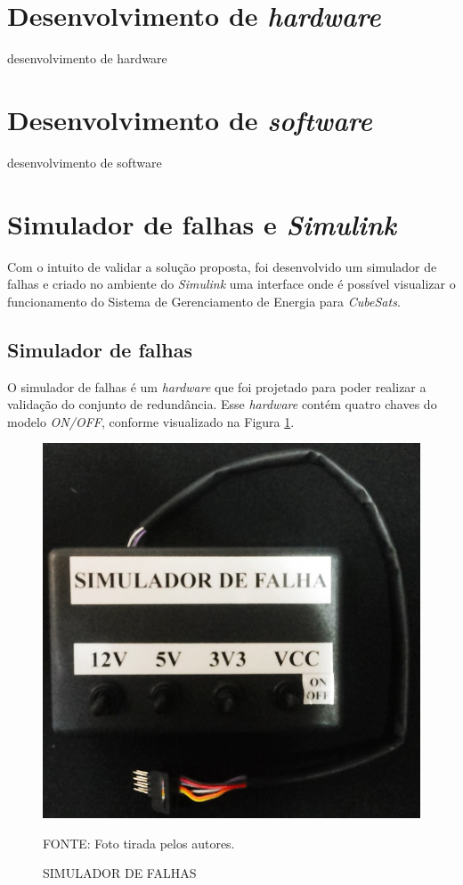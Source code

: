 \documentclass[
	12pt,				%
	openright,			%
	oneside,			%
	a4paper,			%
	english,			%
	french,				%
	spanish,			%
	brazil,				%
	oldfontcommands
	]{abntex2}
\begin{document}
\section[Desenvolvimento de hardware]{Desenvolvimento de \textit{hardware}}

desenvolvimento de hardware

\section[Desenvolvimento de software]{Desenvolvimento de \textit{software}}

desenvolvimento de software

\section[Simulador de falhas e Simulink]{Simulador de falhas e \textit{Simulink}}

	Com o intuito de validar a solução proposta, foi desenvolvido um simulador de falhas e criado no ambiente do \textit{Simulink} uma interface onde é possível visualizar o funcionamento do Sistema de Gerenciamento de Energia para \textit{CubeSats}.
	
\subsection[Simulador de falhas]{Simulador de falhas}

	O simulador de falhas é um \textit{hardware} que foi projetado para poder realizar a validação do conjunto de redundância. Esse \textit{hardware} contém quatro chaves do modelo \textit{ON/OFF}, conforme visualizado na Figura \ref{Fig_Simulador}.
	
	\begin{figure}[th]
		\caption{SIMULADOR DE FALHAS}
		\label{Fig_Simulador}
		\centering
		\includegraphics[width=0.5\linewidth]{./figs/Simulador}
			
		\begin{small}
			FONTE: Foto tirada pelos autores.
		\end{small}		
	\end{figure}
	\pagebreak
\end{document}
